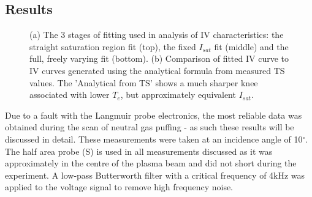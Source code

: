\documentclass[a4paper, 12pt]{article} %
\begin{document}
\subsection{Results}
	\begin{figure}[b!]
		\vspace{-0pt}
		\caption{
			(a) The 3 stages of fitting used in analysis of IV characteristics: the straight saturation region fit (top), the fixed $I_{sat}$ fit (middle) and the full, freely varying fit (bottom).
			(b) Comparison of fitted IV curve to IV curves generated using the 	analytical formula from measured TS values. 
			The 'Analytical from TS' shows a much sharper knee associated with lower $T_e$, but approximately equivalent $I_{sat}$. 
		}
		\vspace{-15pt}
	\end{figure}
	Due to a fault with the Langmuir probe electronics, the most reliable data was obtained during the scan of neutral gas puffing - as such these results will be discussed in detail.
	These measurements were taken at an incidence angle of 10$^{\circ}$.
	The half area probe (S) is used in all measurements discussed as it was approximately in the centre of the plasma beam and did not short during the experiment.
	A low-pass Butterworth filter with a critical frequency of 4kHz was applied to the voltage signal to remove high frequency noise.
	
\end{document}
